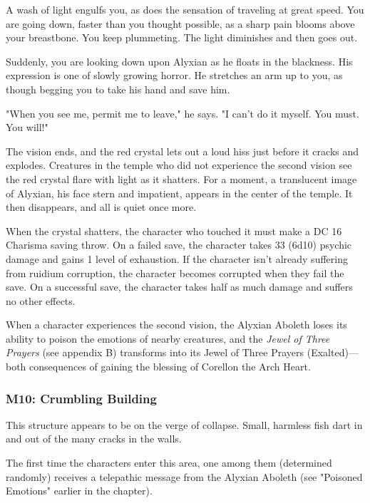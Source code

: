 \documentclass[10pt,a4paper,twoside,fancy,bg=print,twocolumn,openany,nodeprecatedcode]{dndbook}
\begin{document}
\begin{DndReadAloud}{}
A wash of light engulfs you, as does the sensation of traveling at great speed. You are going down, faster than you thought possible, as a sharp pain blooms above your breastbone. You keep plummeting. The light diminishes and then goes out.

Suddenly, you are looking down upon Alyxian as he floats in the blackness. His expression is one of slowly growing horror. He stretches an arm up to you, as though begging you to take his hand and save him.

"When you see me, permit me to leave," he says. "I can't do it myself. You must. You will!"

\end{DndReadAloud}

The vision ends, and the red crystal lets out a loud hiss just before it cracks and explodes. Creatures in the temple who did not experience the second vision see the red crystal flare with light as it shatters. For a moment, a translucent image of Alyxian, his face stern and impatient, appears in the center of the temple. It then disappears, and all is quiet once more.

When the crystal shatters, the character who touched it must make a DC 16 Charisma saving throw. On a failed save, the character takes 33 (6d10) psychic damage and gains 1 level of exhaustion. If the character isn't already suffering from ruidium corruption, the character becomes corrupted when they fail the save. On a successful save, the character takes half as much damage and suffers no other effects.

When a character experiences the second vision, the Alyxian Aboleth loses its ability to poison the emotions of nearby creatures, and the \textit{Jewel of Three Prayers} (see appendix B) transforms into its Jewel of Three Prayers (Exalted)—both consequences of gaining the blessing of Corellon the Arch Heart.

\subsubsection{M10: Crumbling Building}
This structure appears to be on the verge of collapse. Small, harmless fish dart in and out of the many cracks in the walls.

The first time the characters enter this area, one among them (determined randomly) receives a telepathic message from the Alyxian Aboleth (see "Poisoned Emotions" earlier in the chapter).
\end{document}
